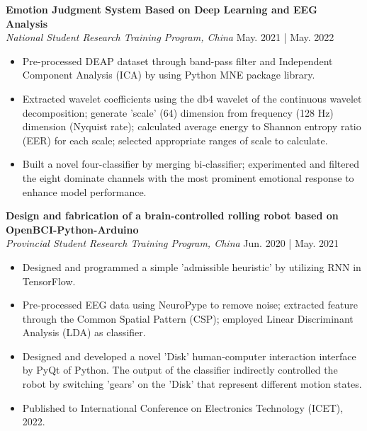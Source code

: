 \documentclass[a4paper,9pt]{extarticle}
\begin{document}
\noindent
\textbf{Emotion Judgment System Based on Deep Learning and EEG Analysis} \\ %
\textit{National Student Research Training Program, China} \hfill May. 2021 | May. 2022 %
\begin{itemize}
    \item Pre-processed DEAP dataset through band-pass filter and Independent Component Analysis (ICA) by using Python MNE package library.
    \item Extracted wavelet coefficients using the db4 wavelet of the continuous wavelet decomposition; generate 'scale' (64) dimension from frequency (128 Hz) dimension (Nyquist rate); calculated average energy to Shannon entropy ratio (EER) for each scale; selected appropriate ranges of scale to calculate.
    \item Built a novel four-classifier by merging bi-classifier; experimented and filtered the eight dominate channels with the most prominent emotional response to enhance model performance.
\end{itemize}

\noindent
\textbf{Design and fabrication of a brain-controlled rolling robot based on OpenBCI-Python-Arduino} \\ %
\textit{Provincial Student Research Training Program, China} \hfill Jun. 2020 | May. 2021 %
\begin{itemize}
    \item Designed and programmed a simple 'admissible heuristic' by utilizing RNN in TensorFlow.
    \item Pre-processed EEG data using NeuroPype to remove noise; extracted feature through the Common Spatial Pattern (CSP); employed Linear Discriminant Analysis (LDA) as classifier.
    \item Designed and developed a novel 'Disk' human-computer interaction interface by PyQt of Python. The output of the classifier indirectly controlled the robot by switching 'gears' on the 'Disk' that represent different motion states.
    \item Published to International Conference on Electronics Technology (ICET), 2022.
\end{itemize}

\end{document}
